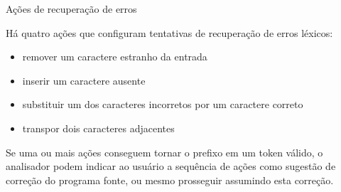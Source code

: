 \begin{frame}[fragile]{Ações de recuperação de erros}

    Há quatro ações que configuram tentativas de recuperação de erros léxicos:
    \pause
    \begin{itemize}
        \item remover um caractere estranho da entrada
        \pause

        \item inserir um caractere ausente
        \pause

        \item substituir um dos caracteres incorretos por um caractere correto
        \pause

        \item transpor dois caracteres adjacentes
    \end{itemize}
    \pause

    \vspace{0.2in}

    Se uma ou mais ações conseguem tornar o prefixo em um token válido, o analisador podem indicar ao usuário a sequência de ações como sugestão de correção do
    programa fonte, ou mesmo prosseguir assumindo esta correção.
\end{frame}
